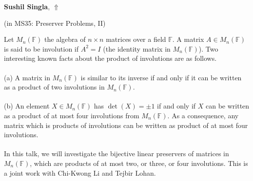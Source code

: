 \documentclass[ILAS2025-program.tex]{subfiles}
\begin{document}
\hypertarget{down0282}{}\begin{ilasabstract}
    
\textbf{Sushil Singla},  \hfill \hyperlink{up0282}{$\Uparrow$}
    
    
(in {\color{mstitle}MS35: Preserver Problems, II})
        
\mtskip
    Let $M_n(\mathbb F)$ the algebra of $n \times n$ matrices over a field  $\mathbb F$.  A matrix $A\in M_n(\mathbb F)$ is said to be involution if $A^2=I$ (the identity matrix in $M_n(\mathbb F)$). Two interesting known facts about the product of involutions are as follows.\\ \\
 (a) A matrix in $  M_n(\mathbb F)$ is similar to its inverse if and only if it can be written as a product of two involutions in $M_n(\mathbb F)$.\\ \\
 (b) An element $X \in M_n(\mathbb F)$ has $\det(X) =\pm 1$ if and only if $X$ can be written as a product of at most four involutions from $M_n(\mathbb F)$. As a consequence, any matrix which is products of involutions can be written as product of at most four involutions.\\ \\
In this talk, we will investigate the bijective linear preservers of matrices in $M_n(\mathbb F)$, which are products of at most two, or three, or four involutions. This is a joint work with Chi-Kwong Li and Tejbir Lohan.


\end{ilasabstract}
    
\end{document}
